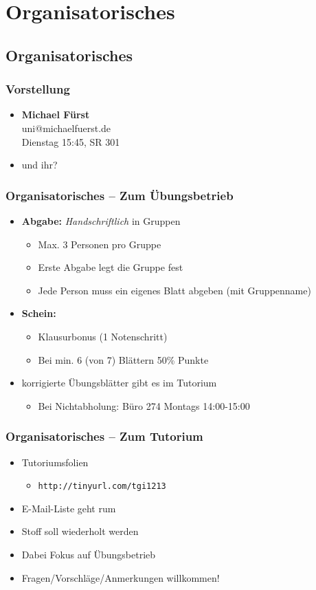

\section{Organisatorisches}

\subsection{Organisatorisches}

\begin{frame}
	\frametitle{Vorstellung}
	
	\begin{itemize}
		\item \textbf{Michael Fürst} \\ uni@michaelfuerst.de \\ Dienstag 15:45, SR 301
		\\
		\item und ihr?
	\end{itemize}
\end{frame}

\begin{frame}
	\frametitle{Organisatorisches -- Zum Übungsbetrieb}
	\begin{itemize}
		\item \textbf{Abgabe:} \emph{Handschriftlich} in Gruppen
		\begin{itemize}
			\item Max. 3 Personen pro Gruppe
			\item Erste Abgabe legt die Gruppe fest
			\item Jede Person muss ein eigenes Blatt abgeben (mit Gruppenname)
		\end{itemize}
		\item \textbf{Schein:} 
		\begin{itemize}
			\item Klausurbonus (1 Notenschritt)
			\item Bei min. 6 (von 7) Blättern 50\% Punkte
		\end{itemize}
		\item korrigierte Übungsblätter gibt es im Tutorium
		\begin{itemize}
			\item Bei Nichtabholung: Büro 274 Montags 14:00-15:00
		\end{itemize}
	\end{itemize}
\end{frame}
\begin{frame}
	\frametitle{Organisatorisches -- Zum Tutorium}
	\begin{itemize}
	\item Tutoriumsfolien
		\begin{itemize}
			\item \texttt{http://tinyurl.com/tgi1213}
		\end{itemize}
		\item E-Mail-Liste geht rum
		\item Stoff soll wiederholt werden
		\item Dabei Fokus auf Übungsbetrieb
		\item Fragen/Vorschläge/Anmerkungen willkommen!
	\end{itemize}
\end{frame}
